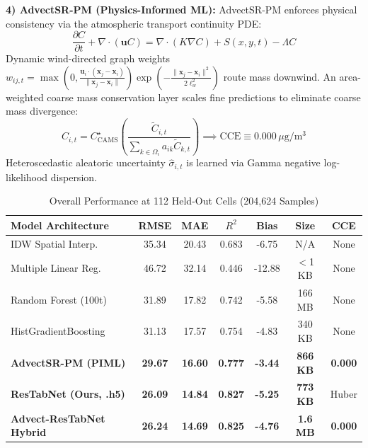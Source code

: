 \documentclass[conference]{IEEEtran}
\begin{document}
\textbf{4) AdvectSR-PM (Physics-Informed ML):} AdvectSR-PM enforces physical consistency via the atmospheric transport continuity PDE:
\begin{equation}
\frac{\partial C}{\partial t} + \nabla \cdot (\mathbf{u} C) = \nabla \cdot (K \nabla C) + S(x,y,t) - \Lambda C
\end{equation}
Dynamic wind-directed graph weights $w_{ij,t} = \max\left(0, \frac{\mathbf{u}_i \cdot (\mathbf{x}_j - \mathbf{x}_i)}{\|\mathbf{x}_j - \mathbf{x}_i\|}\right) \exp\left(-\frac{\|\mathbf{x}_j - \mathbf{x}_i\|^2}{2\ell_w^2}\right)$ route mass downwind. An area-weighted coarse mass conservation layer scales fine predictions to eliminate coarse mass divergence:
\begin{equation}
\hat{C}_{i,t} = C^\star_{\text{CAMS}} \left( \frac{\tilde{C}_{i,t}}{\sum_{k \in \Omega_i} a_{ik} \tilde{C}_{k,t}} \right) \implies \text{CCE} \equiv 0.000\,\mu\text{g}/\text{m}^3
\end{equation}
Heteroscedastic aleatoric uncertainty $\hat{\sigma}_{i,t}$ is learned via Gamma negative log-likelihood dispersion.

\begin{table}[t]
\caption{Overall Performance at 112 Held-Out Cells (204,624 Samples)}
\centering
\begin{tabular}{lcccccc}
\toprule
\textbf{Model Architecture} & \textbf{RMSE} & \textbf{MAE} & \textbf{$R^2$} & \textbf{Bias} & \textbf{Size} & \textbf{CCE} \\
\midrule
IDW Spatial Interp. & 35.34 & 20.43 & 0.683 & -6.75 & N/A & None \\
Multiple Linear Reg. & 46.72 & 32.14 & 0.446 & -12.88 & $<$1 KB & None \\
Random Forest (100t) & 31.89 & 17.82 & 0.742 & -5.58 & 166 MB & None \\
HistGradientBoosting & 31.13 & 17.57 & 0.754 & -4.83 & 340 KB & None \\
\textbf{AdvectSR-PM (PIML)} & \textbf{29.67} & \textbf{16.60} & \textbf{0.777} & \textbf{-3.44} & \textbf{866 KB} & \textbf{0.000} \\
\textbf{ResTabNet (Ours, .h5)} & \textbf{26.09} & \textbf{14.84} & \textbf{0.827} & \textbf{-5.25} & \textbf{773 KB} & Huber \\
\textbf{Advect-ResTabNet Hybrid} & \textbf{26.24} & \textbf{14.69} & \textbf{0.825} & \textbf{-4.76} & \textbf{1.6 MB} & \textbf{0.000} \\
\bottomrule
\end{tabular}
\label{tab:overall}
\end{table}
\end{document}
